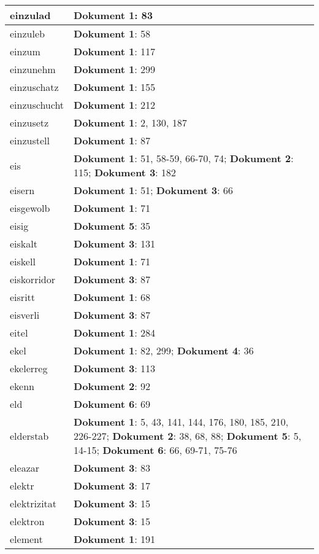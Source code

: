 \documentclass[a5paper]{article}
\begin{document}
\begin{longtable}[l]{|l|p{3in}|}
\hline
einzulad & \textbf{Dokument 1}: 83 \\
\hline
einzuleb & \textbf{Dokument 1}: 58 \\
\hline
einzum & \textbf{Dokument 1}: 117 \\
\hline
einzunehm & \textbf{Dokument 1}: 299 \\
\hline
einzuschatz & \textbf{Dokument 1}: 155 \\
\hline
einzuschucht & \textbf{Dokument 1}: 212 \\
\hline
einzusetz & \textbf{Dokument 1}: 2, 130, 187 \\
\hline
einzustell & \textbf{Dokument 1}: 87 \\
\hline
eis & \textbf{Dokument 1}: 51, 58-59, 66-70, 74; \textbf{Dokument 2}: 115; \textbf{Dokument 3}: 182 \\
\hline
eisern & \textbf{Dokument 1}: 51; \textbf{Dokument 3}: 66 \\
\hline
eisgewolb & \textbf{Dokument 1}: 71 \\
\hline
eisig & \textbf{Dokument 5}: 35 \\
\hline
eiskalt & \textbf{Dokument 3}: 131 \\
\hline
eiskell & \textbf{Dokument 1}: 71 \\
\hline
eiskorridor & \textbf{Dokument 3}: 87 \\
\hline
eisritt & \textbf{Dokument 1}: 68 \\
\hline
eisverli & \textbf{Dokument 3}: 87 \\
\hline
eitel & \textbf{Dokument 1}: 284 \\
\hline
ekel & \textbf{Dokument 1}: 82, 299; \textbf{Dokument 4}: 36 \\
\hline
ekelerreg & \textbf{Dokument 3}: 113 \\
\hline
ekenn & \textbf{Dokument 2}: 92 \\
\hline
eld & \textbf{Dokument 6}: 69 \\
\hline
elderstab & \textbf{Dokument 1}: 5, 43, 141, 144, 176, 180, 185, 210, 226-227; \textbf{Dokument 2}: 38, 68, 88; \textbf{Dokument 5}: 5, 14-15; \textbf{Dokument 6}: 66, 69-71, 75-76 \\
\hline
eleazar & \textbf{Dokument 3}: 83 \\
\hline
elektr & \textbf{Dokument 3}: 17 \\
\hline
elektrizitat & \textbf{Dokument 3}: 15 \\
\hline
elektron & \textbf{Dokument 3}: 15 \\
\hline
element & \textbf{Dokument 1}: 191 \\

\end{longtable}
\end{document}
